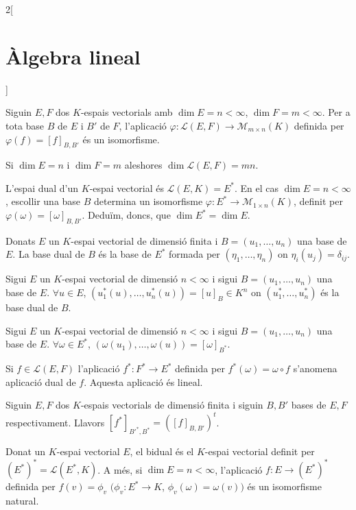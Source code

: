 \documentclass[class=article,10pt,crop=false]{standalone}
\begin{document}
\begin{multicols}{2}[\section{Àlgebra lineal}]
\begin{lemma}
\end{lemma}
\begin{prop}
Siguin $E,F$ dos $K$-espais vectorials amb $\dim E=n<\infty$, $\dim F=m<\infty$. Per a tota base $B$ de $E$ i $B'$ de $F$, l'aplicació $\varphi:\mathcal{L}(E,F)\rightarrow\mathcal{M}_{m\times n}(K)$ definida per $\varphi(f)=[f]_{B,B'}$ és un isomorfisme.
\end{prop}
\begin{corollary}
Si $\dim E=n$ i $\dim F=m$ aleshores $\dim \mathcal{L}(E,F)=mn$.
\end{corollary}
\begin{definition}
L'espai dual d'un $K$-espai vectorial és $\mathcal{L}(E,K)=E^*$. En el cas $\dim E=n<\infty$, escollir una base $B$ determina un isomorfisme $\varphi:E^*\rightarrow\mathcal{M}_{1\times n}(K)$, definit per $\varphi(\omega)=[\omega]_{B,B'}$. Deduïm, doncs, que $\dim E^*=\dim E$.
\end{definition}
\begin{definition}
Donats $E$ un $K$-espai vectorial de dimensió finita i $B=(u_1,\ldots,u_n)$ una base de $E$. La base dual de $B$ és la base de $E^*$ formada per $(\eta_1,\ldots,\eta_n)$ on $\eta_i(u_j)=\delta_{ij}$.
\end{definition}
\begin{lemma}
Sigui $E$ un $K$-espai vectorial de dimensió $n<\infty$ i sigui $B=(u_1,\ldots,u_n)$ una base de $E$. $\forall u\in E$, $(u_1^*(u),\ldots,u_n^*(u))=[u]_B\in K^n$ on $(u_1^*,\ldots,u_n^*)$ és la base dual de $B$.
\end{lemma}
\begin{lemma}
Sigui $E$ un $K$-espai vectorial de dimensió $n<\infty$ i sigui $B=(u_1,\ldots,u_n)$ una base de $E$. $\forall \omega\in E^*$, $(\omega(u_1),\ldots,\omega(u))=[\omega]_{B^*}$.
\end{lemma}
\begin{definition}
Si $f\in \mathcal{L}(E,F)$ l'aplicació $f^*:F^*\rightarrow E^*$ definida per $f^*(\omega)=\omega\circ f$ s'anomena aplicació dual de $f$. Aquesta aplicació és lineal.
\end{definition}
\begin{theorem}
Siguin $E,F$ dos $K$-espais vectorials de dimensió finita i siguin $B,B'$ bases de $E,F$ respectivament. Llavors $[f^*]_{B'^*,B^*}=([f]_{B,B'})^t$.
\end{theorem}
\begin{definition}
Donat un $K$-espai vectorial $E$, el bidual és el $K$-espai vectorial definit per $(E^*)^*=\mathcal{L}(E^*,K)$. A més, si $\dim E=n<\infty$, l'aplicació $f:E\rightarrow (E^*)^*$ definida per $f(v)=\phi_v$ $(\phi_v:E^*\rightarrow K$, $\phi_v(\omega)=\omega(v))$ és un isomorfisme natural. 

\end{definition}
\end{multicols}
\end{document}
